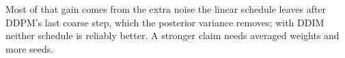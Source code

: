 Most of that gain comes from the extra noise the linear schedule leaves after DDPM's last
coarse step, which the posterior variance removes; with DDIM neither schedule is reliably better. A stronger
claim needs averaged weights and more seeds.
